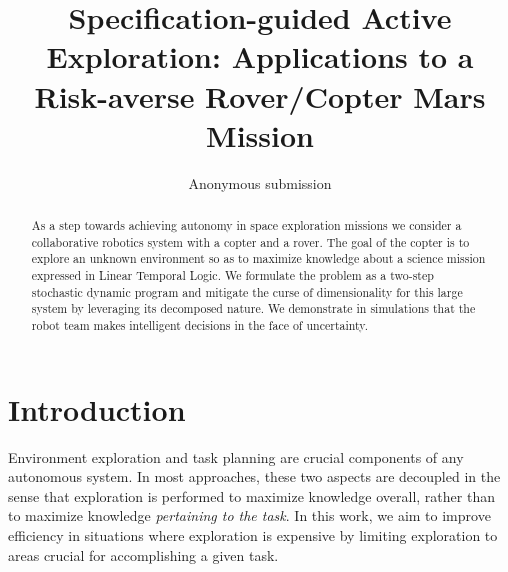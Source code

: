 \documentclass[conference]{IEEEtran}
\begin{document}



\title{\huge Specification-guided Active Exploration: Applications to a Risk-averse Rover/Copter Mars Mission}



\author{Anonymous submission}

\maketitle

\begin{abstract}
  As a step towards achieving autonomy in space exploration missions we consider a collaborative robotics system with a copter and a rover. The goal of the copter is to explore an unknown environment so as to maximize knowledge about a science mission expressed in Linear Temporal Logic. We formulate the problem as a two-step stochastic dynamic program and mitigate the curse of dimensionality for this large system by leveraging its decomposed nature. We demonstrate in simulations that the robot team makes intelligent decisions in the face of uncertainty.
\end{abstract}

\IEEEpeerreviewmaketitle

	

\section{Introduction}

Environment exploration and task planning are crucial components of any autonomous system. In most approaches, these two aspects are decoupled in the sense that exploration is performed to maximize knowledge overall, rather than to maximize knowledge \emph{pertaining to the task}. In this work, we aim to improve efficiency in situations where exploration is expensive by limiting exploration to areas crucial for accomplishing a given task. 
\end{document}
